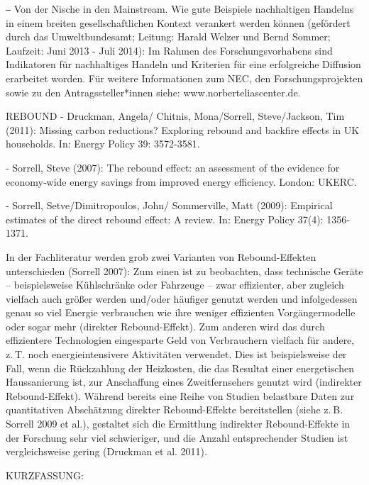 ⎯	Von der Nische in den Mainstream. Wie gute Beispiele nachhaltigen Handelns in einem breiten gesellschaftlichen Kontext verankert werden können (gefördert durch das Umweltbundesamt; Leitung: Harald Welzer und Bernd Sommer; Laufzeit: Juni 2013 - Juli 2014): Im Rahmen des Forschungsvorhabens sind Indikatoren für nachhaltiges Handeln und Kriterien für eine erfolgreiche Diffusion erarbeitet worden. 
Für weitere Informationen zum NEC, den Forschungsprojekten sowie zu den Antragssteller*innen siehe: www.norberteliascenter.de.

REBOUND
-        Druckman, Angela/ Chitnis, Mona/Sorrell, Steve/Jackson, Tim (2011): Missing  carbon reductions? Exploring rebound and backfire effects in UK households. In: Energy Policy 39: 3572-3581.
 

-        Sorrell, Steve (2007): The rebound effect: an assessment of the evidence for economy‐wide energy savings from improved energy efficiency. London: UKERC.

-        Sorrell, Setve/Dimitropoulos, John/ Sommerville, Matt (2009): Empirical estimates of the direct rebound effect: A review. In: Energy Policy 37(4): 1356‐1371.

In der Fachliteratur werden grob zwei Varianten von Rebound-Effekten unterschieden (Sorrell 2007): Zum einen ist zu beobachten, dass technische Geräte – beispielsweise Kühlschränke oder Fahrzeuge – zwar effizienter, aber zugleich vielfach auch größer werden und/oder häufiger genutzt werden und infolgedessen genau so viel Energie verbrauchen wie ihre weniger effizienten Vorgängermodelle oder sogar mehr (direkter Rebound-Effekt). Zum anderen wird das durch effizientere Technologien eingesparte Geld von Verbrauchern vielfach für andere, z. T. noch energieintensivere Aktivitäten verwendet. Dies ist beispielsweise der Fall, wenn die Rückzahlung der Heizkosten, die das Resultat einer energetischen Haussanierung ist, zur Anschaffung eines Zweitfernsehers genutzt wird (indirekter Rebound-Effekt). Während bereits eine Reihe von Studien belastbare Daten zur quantitativen Abschätzung direkter Rebound-Effekte bereitstellen (siehe z. B. Sorrell 2009 et al.), gestaltet sich die Ermittlung indirekter Rebound-Effekte in der Forschung sehr viel schwieriger, und die Anzahl entsprechender Studien ist vergleichsweise gering (Druckman et al. 2011).

KURZFASSUNG:

